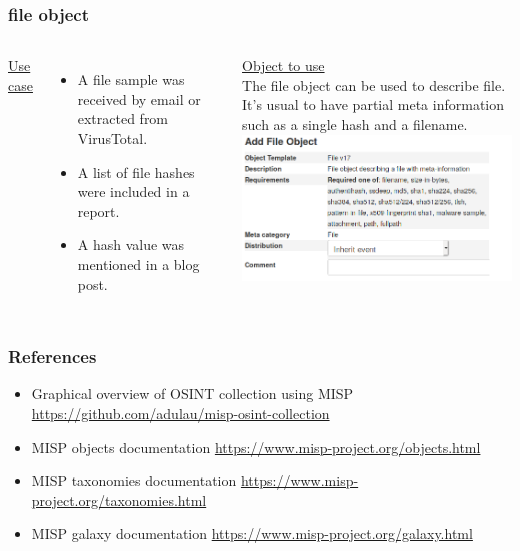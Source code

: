 \begin{frame}
\frametitle{file object}
\begin{columns}[totalwidth=\textwidth]
        \underline{Use case}\\
        \begin{itemize}
                \item A file sample was received by email or extracted from VirusTotal.
                \item A list of file hashes were included in a report.
                \item A hash value was mentioned in a blog post.
        \end{itemize}
        \underline{Object to use}\\
        The file object can be used to describe file. It's usual to have partial meta information such as a single hash and a filename.\\
        \includegraphics[scale=0.25]{fileobject.png}
\end{columns}
\end{frame}

\begin{frame}
        \frametitle{References}
        \begin{itemize}
        \item Graphical overview of OSINT collection using MISP \url{https://github.com/adulau/misp-osint-collection}
        \item MISP objects documentation \url{https://www.misp-project.org/objects.html}
        \item MISP taxonomies documentation \url{https://www.misp-project.org/taxonomies.html}
        \item MISP galaxy documentation \url{https://www.misp-project.org/galaxy.html}
        \end{itemize}
\end{frame}

